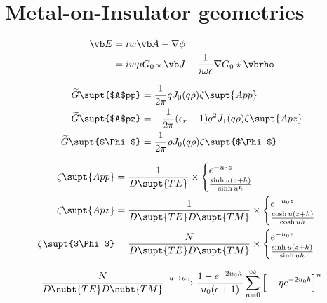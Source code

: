 \documentclass[letterpaper]{article}
\renewcommand{\wt}{\widetilde}
\begin{document}
\newpage
\section{Metal-on-Insulator geometries}

\begin{align*}
 \vb E &= iw \vb A - \nabla \phi
\\
              &= iw\mu G_0\star \vb J 
                 - \frac{1}{i\omega \epsilon}\nabla G_0\star \vbrho
\end{align*}

\begin{align*}
 \wt G\supt{$A$pp}
 &= \frac{1}{2\pi} q J_0(q\rho)\zeta\supt{App}
\\
 \wt G\supt{$A$pz}
 &= -\frac{1}{2\pi}(\epsilon_r-1) q^2 J_1(q\rho)\zeta\supt{Apz}
\\
 \wt G\supt{$\Phi$}
 &= \frac{1}{2\pi} \rho J_0(q\rho)\zeta\supt{$\Phi$}
\end{align*}

\begin{align*}
\zeta\supt{App}&=
 \displaystyle{
 \frac{1}{D\supt{TE}}\times
  \begin{cases} e^{-u_0 z} \\ \frac{\sinh u(z+h)}{\sinh uh} \end{cases}
              }
\\
\zeta\supt{Apz}&=
 \displaystyle{
 \frac{1}{D\supt{TE}D\supt{TM}}\times
 \begin{cases} e^{-u_0 z} \\ \frac{\cosh u(z+h)}{\cosh uh} \end{cases}
              }
\\
\zeta\supt{$\Phi$}&=
 \frac{N}{D\supt{TE}D\supt{TM}}\times
 \begin{cases} e^{-u_0 z} \\
               \frac{\sinh u(z+h)}{\sinh uh}
\end{cases}
\end{align*}

$$ \frac{N}{D\subt{TE}D\subt{TM}}\xrightarrow{u \to u_0}
   \frac{1-e^{-2u_0 h}}{u_0(\epsilon+1)}
   \sum_{n=0}^\infty \Big[-\eta e^{-2u_0 h}\Big]^n
$$

\end{document}
